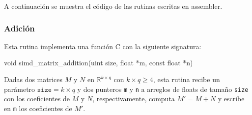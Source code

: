 \documentclass[a4paper, 10pt, twoside]{article}
\newcommand{\cc}[1]{\texttt{#1}}
\begin{document}
A continuación se muestra el código de las rutinas escritas en assembler.


\subsubsection{Adición}

Esta rutina implementa una función C con la siguiente signatura:

\begin{code}
  void simd_matrix_addition(uint size,
                            float *m,
                            const float *n)
\end{code}

Dadas dos matrices $M$ y $N$ en $\mathbb{R}^{k \times q}$ con $k \times q \geq
4$, esta rutina recibe un parámetro $\cc{size} = k \times q$ y dos punteros
\cc{m} y \cc{n} a arreglos de floats de tamaño \cc{size} con los coeficientes
de $M$ y $N$, respectivamente, computa $M' = M + N$ y escribe en \cc{m} los
coeficientes de $M'$.
\end{document}
